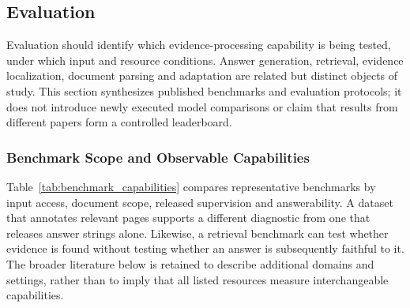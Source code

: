 \subsection{Evaluation}
Evaluation should identify which evidence-processing capability is being tested, under which input and resource conditions. Answer generation, retrieval, evidence localization, document parsing and adaptation are related but distinct objects of study. This section synthesizes published benchmarks and evaluation protocols; it does not introduce newly executed model comparisons or claim that results from different papers form a controlled leaderboard.

\subsubsection{Benchmark Scope and Observable Capabilities}

Table~\ref{tab:benchmark_capabilities} compares representative benchmarks by input access, document scope, released supervision and answerability. A dataset that annotates relevant pages supports a different diagnostic from one that releases answer strings alone. Likewise, a retrieval benchmark can test whether evidence is found without testing whether an answer is subsequently faithful to it. The broader literature below is retained to describe additional domains and settings, rather than to imply that all listed resources measure interchangeable capabilities.

